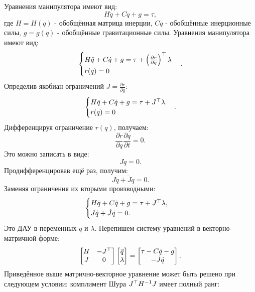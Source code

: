 Уравнения манипулятора имеют вид:
%
\begin{equation}
	{H} \ddot{{q}} + {C} \dot{{q}} + {g} = \tau,
\end{equation}
%
где ${H}={H}({q})$ - обобщённая матрица инерции, ${C}\dot{{q}}$ - обобщённые инерционные силы, ${g}={g}({q})$ - обобщённые гравитационные силы.
Уравнения манипулятора имеют вид:
%
\begin{equation}
	\begin{cases}
		{H} \ddot{{q}} + {C} \dot{{q}} + {g} = \tau + \left( \frac{\partial {r}}{\partial {q}} \right)^\top \lambda
		\\
		{r}({q}) = 0
	\end{cases}.
\end{equation}
%
Определив якобиан ограничений ${J} = \frac{\partial {r}}{\partial {q}}$:
%
\begin{equation}
	\begin{cases}
		{H} \ddot{{q}} + {C} \dot{{q}} + {g} = \tau + {J}^\top \lambda
		\\
		{r}({q}) = 0
	\end{cases}.
\end{equation}
Дифференцируя ограничение ${r}({q})$, получаем:
%
\begin{equation}
	\frac{\partial {r}}{\partial {q}} \frac{\partial {q}}{\partial t} = 0.
\end{equation}
%
Это можно записать в виде:
%
\begin{equation}
	{J} \dot{{q}} = 0.
\end{equation}
%
Продифференцировав ещё раз, получим:
%
\begin{equation}
	{J} \ddot{{q}} + \dot{{J}} \dot{{q}} = 0.
\end{equation}
%
Заменяя ограничения их вторыми производными:
%
\begin{equation}
	\begin{cases}
		{H} \ddot{{q}} + {C} \dot{{q}} + {g} = \tau + {J}^\top \lambda,
		\\
		{J} \dot{{q}} + \dot{{J}} \dot{{q}} = 0.
	\end{cases}
\end{equation}
%
Это ДАУ в переменных ${q}$ и $\lambda$. Перепишем систему уравнений в векторно-матричной форме:
%
\begin{equation}
	\begin{bmatrix}
		{H} & -{J}^\top \\
		{J} & 0
	\end{bmatrix}
	\begin{bmatrix}
		\ddot{{q}} \\
		\lambda
	\end{bmatrix}
	=
	\begin{bmatrix}
		\tau - {C} \dot{{q}} - {g} \\
		-\dot{{J}} \dot{{q}}
	\end{bmatrix}.
\end{equation}
Приведённое выше матрично-векторное уравнение может быть решено при следующем условии: комплимент Шура ${J}^\top {H}^{-1}{J}$ имеет полный ранг:

